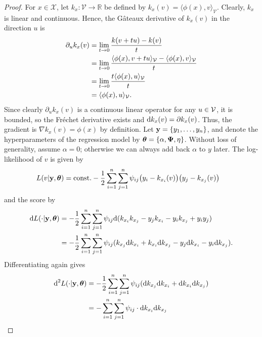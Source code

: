 \begin{proof}
	For $x \in \mathcal X$, let $k_x:\mathcal V \rightarrow \mathbb R$ be defined by $k_x(v) = \langle \phi(x), v \rangle_{\mathcal V}$. 
	Clearly, $k_x$ is linear and continuous.
	Hence, the Gâteaux derivative of $k_x(v)$ in the direction $u$ is
	\begin{align*}
		\partial_u k_x(v)	
		&= \lim_{t \rightarrow 0} \frac{k(v+t u) - k(v)}{t} \\
		&= \lim_{t \rightarrow 0} \frac{\langle \phi(x), v+t u \rangle_{{\mathcal V}} - \langle \phi(x), v \rangle_{{\mathcal V}}}{t} \\
		&= \lim_{t \rightarrow 0} \frac{t\langle \phi(x), u \rangle_{{\mathcal V}}}{t} \\
		&= \langle \phi(x), u \rangle_{{\mathcal V}}.
	\end{align*}
    Since clearly $\partial_u k_x(v)$ is a continuous linear operator for any $u\in{\mathcal V}$, it is bounded, so the Fréchet derivative exists and $\text{d} k_x(v) = \partial k_x(v)$.
	Thus, the gradient is $\nabla k_x(v) = \phi(x)$ by definition. 
	Let ${\mathbf y} = \{y_1,\dots,y_n\}$, and denote the hyperparameters of the regression model by ${\bm\theta} = \{ \alpha,{\bm\Psi},\eta \}$.
	Without loss of generality, assume $\alpha = 0$; otherwise we can always add back $\alpha$ to $y$ later.
	The log-likelihood of $v$ is given by
	\begin{align*}
		L(v|{\mathbf y},{\bm\theta}) 
		&= \text{const.} - \frac{1}{2} \sum_{i=1}^n\sum_{j=1}^n \psi_{ij}\big(y_i - k_{x_i}(v)\big)\big(y_j  - k_{x_j}(v)\big)
	\end{align*}
	and the score by
	\begin{align*}
		\text{d} L(\cdot|{\mathbf y},{\bm\theta})
		&= - \frac{1}{2} \sum_{i=1}^n\sum_{j=1}^n \psi_{ij} \text{d} (k_{x_i}k_{x_j} - y_jk_{x_i} - y_ik_{x_j} + y_iy_j )  \\
		&= - \frac{1}{2} \sum_{i=1}^n\sum_{j=1}^n \psi_{ij} (k_{x_j} \text{d} k_{x_i}  + k_{x_i}\text{d} k_{x_j} - y_j\text{d} k_{x_i} - y_i\text{d} k_{x_j} ).
	\end{align*}
	Differentiating again gives
	\begin{align*}
		\d^2 L(\cdot|\by,\btheta)
		&= - \frac{1}{2} \sum_{i=1}^n\sum_{j=1}^n \psi_{ij} (\d k_{x_j} \d k_{x_i}  + \d k_{x_i}\d k_{x_j}) \\
		&= - \sum_{i=1}^n\sum_{j=1}^n \psi_{ij} \cdot \d k_{x_i} \d k_{x_j}

\end{align*}
\end{proof}

